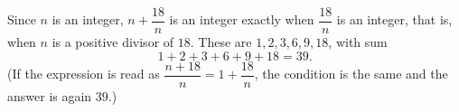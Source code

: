 Since $n$ is an integer, $n+\dfrac{18}{n}$ is an integer exactly when $\dfrac{18}{n}$ is an integer, that is, when $n$ is a positive divisor of $18$. These are $1,2,3,6,9,18$, with sum
\[
1+2+3+6+9+18=\boxed{39}.
\]
(If the expression is read as $\dfrac{n+18}{n}=1+\dfrac{18}{n}$, the condition is the same and the answer is again $39$.)
